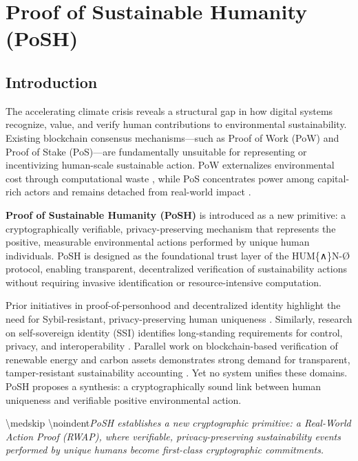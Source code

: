 \documentclass{article}
\begin{document}
\section{Proof of Sustainable Humanity (PoSH)}

\subsection{Introduction}

The accelerating climate crisis reveals a structural gap in how digital systems
recognize, value, and verify human contributions to environmental sustainability.
Existing blockchain consensus mechanisms---such as Proof of Work (PoW) and Proof
of Stake (PoS)---are fundamentally unsuitable for representing or incentivizing
human-scale sustainable action. PoW externalizes environmental cost through
computational waste \cite{goodell2020greenBlockchain}, while PoS concentrates power among capital-rich actors and
remains detached from real-world impact \cite{saleh2021pos}.

\textbf{Proof of Sustainable Humanity (PoSH)} is introduced as a new primitive:
a cryptographically verifiable, privacy-preserving mechanism that represents the
positive, measurable environmental actions performed by unique human individuals.
PoSH is designed as the foundational trust layer of the HUM\{∧\}N-Ø
protocol, enabling transparent, decentralized verification of sustainability
actions without requiring invasive identification or resource-intensive
computation.

Prior initiatives in proof-of-personhood and decentralized identity highlight
the need for Sybil-resistant, privacy-preserving human uniqueness
\citet{ohlhaver2025compressed, worldcoinWhitepaper, polkadot2025individuality}.
Similarly, research on self-sovereign identity (SSI) identifies long-standing
requirements for control, privacy, and interoperability
\citet{schardong2022ssiSurvey, pava2024ssiBlockchain}. Parallel work on
blockchain-based verification of renewable energy and carbon assets demonstrates
strong demand for transparent, tamper-resistant sustainability accounting
\citet{energy2024recTrading, fu2023recCommunity, infosys2025blockchainREC}.
Yet no system unifies these domains. PoSH proposes a synthesis: a
cryptographically sound link between human uniqueness and verifiable positive
environmental action.

{\textbackslash}medskip
{\textbackslash}noindent\textit{PoSH establishes a new cryptographic primitive: a Real-World
Action Proof (RWAP), where verifiable, privacy-preserving sustainability events
performed by unique humans become first-class cryptographic commitments.}
\end{document}
